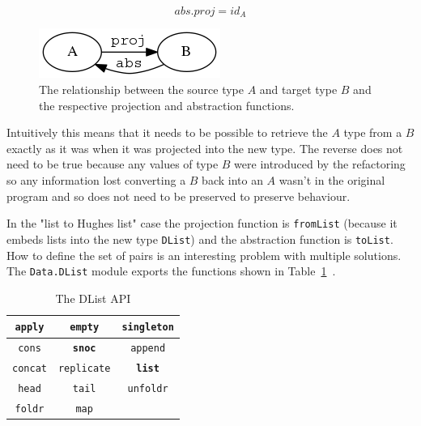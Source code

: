 \begin{figure}[t]
\begin{equation}\label{eq1}
abs . proj = id_A
\end{equation}
\end{figure}

\begin{figure}[h]
	\begin{center}
		\includegraphics[scale=.5]{graphVis/Chapter3/galoisConn.png}
	\end{center}
	\caption{The relationship between the source type $A$ and target type $B$ and the respective projection and abstraction functions.}
	\label{galois}
\end{figure}

Intuitively this means that it needs to be possible to retrieve the $A$ type from a $B$ exactly as it was when it was projected into the new type. The reverse does not need to be true because any values of type $B$ were introduced by the refactoring so any information lost converting a $B$ back into an $A$ wasn't in the original program and so does not need to be preserved to preserve behaviour.

In the "list to Hughes list" case the projection function is \texttt{fromList} (because it embeds lists into the new type \texttt{DList}) and the abstraction function is \texttt{toList}. How to define the set of pairs is an interesting problem with multiple solutions. The \texttt{Data.DList} module exports the  functions shown in Table~\ref{dlistApi}~\citep{dlist}.


\begin{table}
\begin{center}
\begin{tabular}{| c | c | c |}
  \hline
  \texttt{apply} & \texttt{empty} & \texttt{singleton}\\
  \hline
  \texttt{cons} & \textbf{\texttt{snoc}} & \texttt{append} \\
  \hline
  \texttt{concat} & \texttt{replicate} & \textbf{\texttt{list}}\\ 
  \hline	
  \texttt{head} & \texttt{tail} & \texttt{unfoldr}\\ 
  \hline  
  \texttt{foldr} & \texttt{map} & \\
  \hline
\end{tabular}
\end{center}
\caption{The DList API}
\label{dlistApi}
\end{table}


